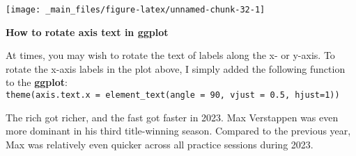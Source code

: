 \documentclass[
]{book}
\begin{document}
\begin{center}\texttt{[image: \_main\_files/figure-latex/unnamed-chunk-32-1]} \end{center}

\begin{blackbox}

\begin{center}
\textbf{How to rotate axis text in ggplot}

\end{center}

At times, you may wish to rotate the text of labels along the x- or y-axis. To rotate the x-axis labels in the plot above, I simply added the following function to the \textbf{ggplot}: \texttt{theme(axis.text.x\ =\ element\_text(angle\ =\ 90,\ vjust\ =\ 0.5,\ hjust=1))}

\end{blackbox}

The rich got richer, and the fast got faster in 2023. Max Verstappen was even more dominant in his third title-winning season. Compared to the previous year, Max was relatively even quicker across all practice sessions during 2023.
\end{document}
